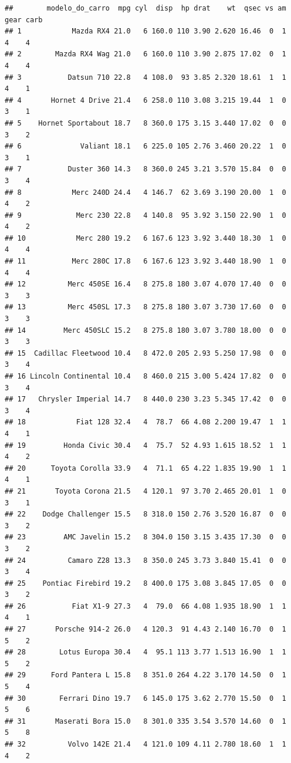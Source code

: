 \documentclass[
]{book}
\begin{document}
\begin{verbatim}
##        modelo_do_carro  mpg cyl  disp  hp drat    wt  qsec vs am gear carb
## 1            Mazda RX4 21.0   6 160.0 110 3.90 2.620 16.46  0  1    4    4
## 2        Mazda RX4 Wag 21.0   6 160.0 110 3.90 2.875 17.02  0  1    4    4
## 3           Datsun 710 22.8   4 108.0  93 3.85 2.320 18.61  1  1    4    1
## 4       Hornet 4 Drive 21.4   6 258.0 110 3.08 3.215 19.44  1  0    3    1
## 5    Hornet Sportabout 18.7   8 360.0 175 3.15 3.440 17.02  0  0    3    2
## 6              Valiant 18.1   6 225.0 105 2.76 3.460 20.22  1  0    3    1
## 7           Duster 360 14.3   8 360.0 245 3.21 3.570 15.84  0  0    3    4
## 8            Merc 240D 24.4   4 146.7  62 3.69 3.190 20.00  1  0    4    2
## 9             Merc 230 22.8   4 140.8  95 3.92 3.150 22.90  1  0    4    2
## 10            Merc 280 19.2   6 167.6 123 3.92 3.440 18.30  1  0    4    4
## 11           Merc 280C 17.8   6 167.6 123 3.92 3.440 18.90  1  0    4    4
## 12          Merc 450SE 16.4   8 275.8 180 3.07 4.070 17.40  0  0    3    3
## 13          Merc 450SL 17.3   8 275.8 180 3.07 3.730 17.60  0  0    3    3
## 14         Merc 450SLC 15.2   8 275.8 180 3.07 3.780 18.00  0  0    3    3
## 15  Cadillac Fleetwood 10.4   8 472.0 205 2.93 5.250 17.98  0  0    3    4
## 16 Lincoln Continental 10.4   8 460.0 215 3.00 5.424 17.82  0  0    3    4
## 17   Chrysler Imperial 14.7   8 440.0 230 3.23 5.345 17.42  0  0    3    4
## 18            Fiat 128 32.4   4  78.7  66 4.08 2.200 19.47  1  1    4    1
## 19         Honda Civic 30.4   4  75.7  52 4.93 1.615 18.52  1  1    4    2
## 20      Toyota Corolla 33.9   4  71.1  65 4.22 1.835 19.90  1  1    4    1
## 21       Toyota Corona 21.5   4 120.1  97 3.70 2.465 20.01  1  0    3    1
## 22    Dodge Challenger 15.5   8 318.0 150 2.76 3.520 16.87  0  0    3    2
## 23         AMC Javelin 15.2   8 304.0 150 3.15 3.435 17.30  0  0    3    2
## 24          Camaro Z28 13.3   8 350.0 245 3.73 3.840 15.41  0  0    3    4
## 25    Pontiac Firebird 19.2   8 400.0 175 3.08 3.845 17.05  0  0    3    2
## 26           Fiat X1-9 27.3   4  79.0  66 4.08 1.935 18.90  1  1    4    1
## 27       Porsche 914-2 26.0   4 120.3  91 4.43 2.140 16.70  0  1    5    2
## 28        Lotus Europa 30.4   4  95.1 113 3.77 1.513 16.90  1  1    5    2
## 29      Ford Pantera L 15.8   8 351.0 264 4.22 3.170 14.50  0  1    5    4
## 30        Ferrari Dino 19.7   6 145.0 175 3.62 2.770 15.50  0  1    5    6
## 31       Maserati Bora 15.0   8 301.0 335 3.54 3.570 14.60  0  1    5    8
## 32          Volvo 142E 21.4   4 121.0 109 4.11 2.780 18.60  1  1    4    2
\end{verbatim}
\end{document}
